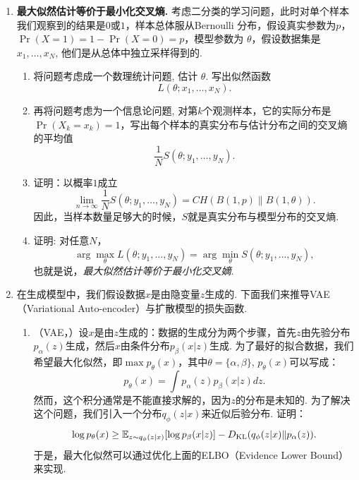 \begin{enumerate}[wide, labelindent=0pt]
    \item \label{exercise:cross-entropy-maximum-likelihood} \textbf{最大似然估计等价于最小化交叉熵. }考虑二分类的学习问题，此时对单个样本我们观察到的结果是$0$或$1$，样本总体服从Bernoulli 分布，假设真实参数为$p$， $\Pr(X=1)=1-\Pr(X=0)=p$，模型参数为 $\theta$，假设数据集是 $x_1,\dots,x_N$, 他们是从总体中独立采样得到的.
    \begin{enumerate}
        \item 将问题考虑成一个数理统计问题, 估计 $\theta$. 写出似然函数 
        \[L(\theta ; x_1, \ldots, x_N).\]
        \item 再将问题考虑为一个信息论问题, 对第$k$个观测样本，它的实际分布是$\Pr(X_k=x_k)=1$，写出每个样本的真实分布与估计分布之间的交叉熵的平均值
        \[\frac{1}{N}S(\theta ; y_1, \ldots, y_N).\]
        \item 证明：以概率$1$成立
        \[\lim_{n\to\infty}\frac{1}{N}S(\theta ; y_1, \ldots, y_N)=CH(B(1,p)\| B(1,\theta)).\]
        因此，当样本数量足够大的时候，$S$就是真实分布与模型分布的交叉熵.
        \item 证明: 对任意$N$，
        \[\arg\max_\theta L(\theta ; y_1, \ldots, y_N)=\arg\min _\theta S(\theta ; y_1, \ldots, y_N),\]
        也就是说，\textit{最大似然估计等价于最小化交叉嫡}.
    \end{enumerate}

    \item \label{exercise:diffusion-model-loss}
    在生成模型中，我们假设数据$x$是由隐变量$z$生成的. 下面我们来推导VAE（Variational Auto-encoder）与扩散模型的损失函数.
    \begin{enumerate}
        \item （VAE，\cite{kingmaAutoEncodingVariationalBayes2022,kingmaSemisupervisedLearningDeep2014}）设$x$是由$z$生成的：数据的生成分为两个步骤，首先$z$由先验分布$p_{\alpha}(z)$生成，然后$x$由条件分布$p_{\beta}(x|z)$生成. 为了最好的拟合数据，我们希望最大化似然，即$\max p_{\theta}(x)$，其中$\theta = \{\alpha, \beta\}$, $p_{\theta}(x)$可以写成：
        \[
            p_{\theta}(x) = \int p_{\alpha}(z)p_{\beta}(x|z)dz.
        \]
        然而，这个积分通常是不能直接求解的，因为$z$的分布是未知的. 为了解决这个问题，我们引入一个分布$q_{\phi}(z|x)$来近似后验分布. 证明：
        \[
            \log p_{\theta}(x) \geq \mathbb{E}_{z\sim q_{\phi}(z|x)}[\log p_{\beta}(x|z)] - D_{\mathrm{KL}}(q_{\phi}(z|x)\Vert p_{\alpha}(z)).
        \]
        于是，最大化似然可以通过优化上面的ELBO（Evidence Lower Bound）来实现.


\end{enumerate}
\end{enumerate}
